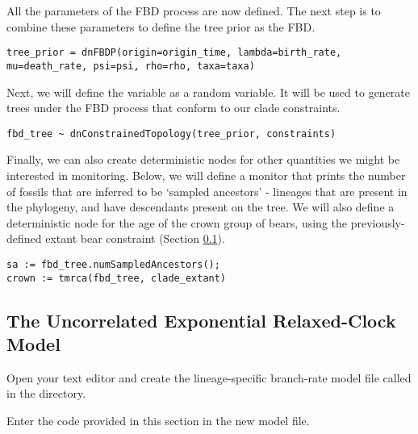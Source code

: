 All the parameters of the FBD process are now defined. The next step is to combine these parameters to define the tree prior as the FBD.

{\tt \begin{snugshade*}
\begin{lstlisting}
tree_prior = dnFBDP(origin=origin_time, lambda=birth_rate, mu=death_rate, psi=psi, rho=rho, taxa=taxa)
\end{lstlisting}
\end{snugshade*}}

Next, we will define the  variable as a random variable. It will be used to generate trees under the FBD process that conform to our clade constraints. 

{\tt \begin{snugshade*}
\begin{lstlisting}
fbd_tree ~ dnConstrainedTopology(tree_prior, constraints) 
\end{lstlisting}
\end{snugshade*}}

Finally, we can also create deterministic nodes for other quantities we might be interested in monitoring. Below, we will define a monitor that prints the number of fossils that are inferred to be `sampled ancestors' - lineages that are present in the phylogeny, and have descendants present on the tree. We will also define a deterministic node for the age of the crown group of bears, using the previously-defined extant bear constraint (Section \ref{}).

{\tt \begin{snugshade*}
\begin{lstlisting}
sa := fbd_tree.numSampledAncestors();
crown := tmrca(fbd_tree, clade_extant)
\end{lstlisting}
\end{snugshade*}}

\bigskip

\subsection{The Uncorrelated Exponential Relaxed-Clock Model}

{\begin{framed}
Open your text editor and create the lineage-specific branch-rate model file called {\textcolor{red}{}} in the  directory.

Enter the \Rev code provided in this section in the new model file.
\end{framed}}


